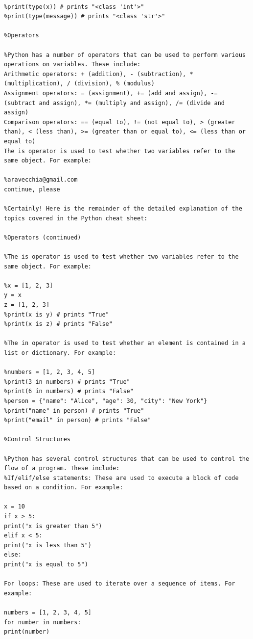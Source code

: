 \begin{lstlisting}[style=PythonStyle, label=lst:PythonCode]
%You can use the type() function to determine the type of a variable. For example:

%print(type(x)) # prints "<class 'int'>"
%print(type(message)) # prints "<class 'str'>"

%Operators

%Python has a number of operators that can be used to perform various operations on variables. These include:
Arithmetic operators: + (addition), - (subtraction), * (multiplication), / (division), % (modulus)
Assignment operators: = (assignment), += (add and assign), -= (subtract and assign), *= (multiply and assign), /= (divide and assign)
Comparison operators: == (equal to), != (not equal to), > (greater than), < (less than), >= (greater than or equal to), <= (less than or equal to)
The is operator is used to test whether two variables refer to the same object. For example:

%aravecchia@gmail.com
continue, please

%Certainly! Here is the remainder of the detailed explanation of the topics covered in the Python cheat sheet:

%Operators (continued)

%The is operator is used to test whether two variables refer to the same object. For example:

%x = [1, 2, 3]
y = x
z = [1, 2, 3]
%print(x is y) # prints "True"
%print(x is z) # prints "False"

%The in operator is used to test whether an element is contained in a list or dictionary. For example:

%numbers = [1, 2, 3, 4, 5]
%print(3 in numbers) # prints "True"
%print(6 in numbers) # prints "False"
%person = {"name": "Alice", "age": 30, "city": "New York"}
%print("name" in person) # prints "True"
%print("email" in person) # prints "False"

%Control Structures

%Python has several control structures that can be used to control the flow of a program. These include:
%If/elif/else statements: These are used to execute a block of code based on a condition. For example:

x = 10
if x > 5:
print("x is greater than 5")
elif x < 5:
print("x is less than 5")
else:
print("x is equal to 5")

For loops: These are used to iterate over a sequence of items. For example:

numbers = [1, 2, 3, 4, 5]
for number in numbers:
print(number)


\end{lstlisting}

